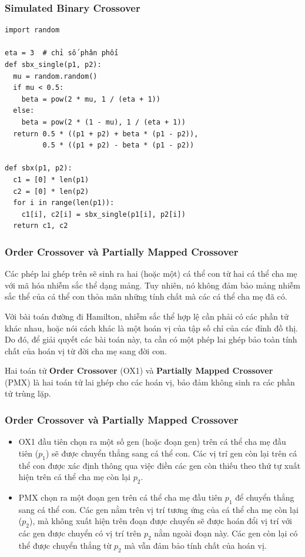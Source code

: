 \begin{frame}[fragile]
\frametitle{Simulated Binary Crossover}
\begin{verbatim}
import random

eta = 3  # chỉ số phân phối
def sbx_single(p1, p2):
  mu = random.random()
  if mu < 0.5:
    beta = pow(2 * mu, 1 / (eta + 1)) 
  else:
    beta = pow(2 * (1 - mu), 1 / (eta + 1))
  return 0.5 * ((p1 + p2) + beta * (p1 - p2)),
         0.5 * ((p1 + p2) - beta * (p1 - p2))

def sbx(p1, p2):
  c1 = [0] * len(p1)
  c2 = [0] * len(p2)
  for i in range(len(p1)):
    c1[i], c2[i] = sbx_single(p1[i], p2[i])
  return c1, c2
\end{verbatim}
\end{frame}

\begin{frame}[fragile]
\frametitle{Order Crossover và Partially Mapped Crossover}
Các phép lai ghép trên sẽ sinh ra hai (hoặc một) cá thể con từ hai cá thể cha mẹ
với mã hóa nhiễm sắc thể dạng mảng. Tuy nhiên, nó không đảm bảo mảng nhiễm sắc
thể của cá thể con thỏa mãn những tính chất mà các cá thể cha mẹ đã có.

Với bài toán đường đi Hamilton, nhiễm sắc thể hợp lệ cần phải có các phần tử
khác nhau, hoặc nói cách khác là một hoán vị của tập số chỉ của các đỉnh đồ thị.
Do đó, để giải quyết các bài toán này, ta cần có một phép lai ghép bảo toàn tính
chất của hoán vị từ đời cha mẹ sang đời con.

Hai toán tử \textbf{Order Crossover} (OX1) và \textbf{Partially Mapped
Crossover} (PMX) là hai toán tử lai ghép cho các hoán vị, bảo đảm không sinh ra
các phần tử trùng lặp.
\end{frame}

\begin{frame}[fragile]
\frametitle{Order Crossover và Partially Mapped Crossover}
\begin{itemize}
\item 
OX1 đầu tiên chọn ra một số gen (hoặc đoạn gen) trên cá thể cha mẹ đầu tiên (\(
p_{1}\)) sẽ
được chuyển thẳng sang cá thể con. Các vị trí gen còn lại trên cá thể con được
xác định thông qua việc điền các gen còn thiếu theo thứ tự xuất hiện trên cá thể
cha mẹ còn lại \( p_{2} \).

\item
PMX chọn ra một đoạn gen trên cá thể cha mẹ đầu tiên \( p_{1} \) để chuyển thẳng
sang cá thể con. Các gen nằm trên vị trí tương ứng của cá thể cha mẹ còn lại (\(
p_{2}\)), mà không xuất hiện trên đoạn được chuyển sẽ được hoán đổi vị trí với
các gen được chuyển có vị trí trên \( p_{2} \) nằm ngoài đoạn này. Các gen còn
lại có thể được chuyển thẳng từ \( p_{2} \) mà vẫn đảm bảo tính chất của hoán
vị.
\end{itemize}
\end{frame}


